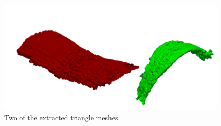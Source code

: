 \begin{figure}[h]
  \centering
   \includegraphics[width=0.9\linewidth]{imagesMT2014/mesh2.png}
   \caption{Two of the extracted triangle meshes.}
   \label{fig:mesh}
   \end{figure}





